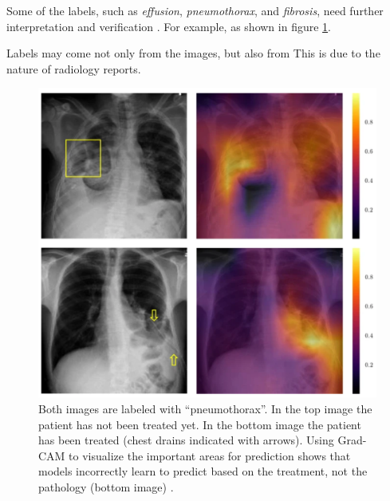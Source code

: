 \begin{singlespace}
{Some of the labels, such as \textit{effusion}, \textit{pneumothorax}, and \textit{fibrosis}, need further interpretation and verification \cite{OakdenRayner2018}. For example,  \cite{Baltruschat2019} as shown in figure \ref{fig:chestX-ray8-pneumothorax-with-drain}. 

Labels may come not only from the images, but also from  \cite{HealthClinicalCenter2017} This is due to the nature of radiology reports.  \cite{OakdenRayner2018}

\begin{figure}[!htb]
    \centering
    \includegraphics[width=0.9\columnwidth]{figures/chestX-ray8-pneumothorax-with-drain.png}
    \caption[Model erroneously picking up chest drains as main feature of ``pneumothorax''.]{Both images are labeled with ``pneumothorax''. In the top image the patient has not been treated yet. In the bottom image the patient has been treated (chest drains indicated with arrows). Using Grad-CAM \cite{Selvaraju2019} to visualize the important areas for prediction shows that models incorrectly learn to predict based on the treatment, not the pathology (bottom image) \cite{Baltruschat2019}.}
    \label{fig:chestX-ray8-pneumothorax-with-drain}
\end{figure}
}


\end{singlespace}
